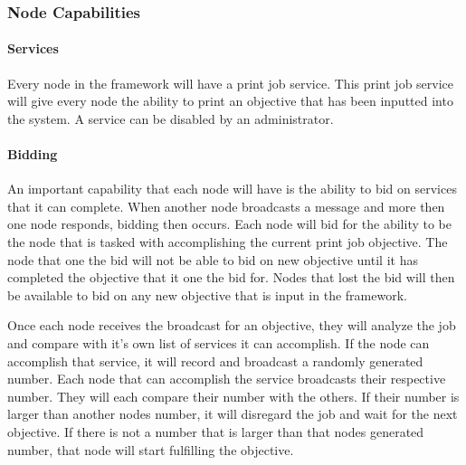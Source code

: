 \documentclass[draftclsnofoot, onecolumn, compsoc, 10pt]{IEEEtran}
\begin{document}


\subsubsection{Node Capabilities}
\paragraph{Services}
Every node in the framework will have a print job service. This print job service will give every node the ability to print an objective that has been inputted into the system. A service can be disabled by an administrator.

\paragraph{Bidding}
An important capability that each node will have is the ability to bid on services that it can complete. When another node broadcasts a message and more then one node responds, bidding then occurs. Each node will bid for the ability to be the node that is tasked with accomplishing the current print job objective. The node that one the bid will not be able to bid on new objective until it has completed the objective that it one the bid for. Nodes that lost the bid will then be available to bid on any new objective that is input in the framework.

Once each node receives the broadcast for an objective, they will analyze the job and compare with it's own list of services it can accomplish. If the node can accomplish that service, it will record and broadcast a randomly generated number. Each node that can accomplish the service broadcasts their respective number. They will each compare their number with the others. If their number is larger than another nodes number, it will disregard the job and wait for the next objective. If there is not a number that is larger than that nodes generated number, that node will start fulfilling the objective.
\end{document}
